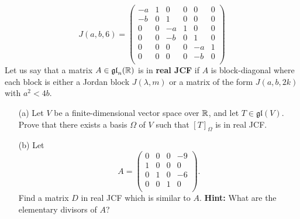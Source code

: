 \documentclass[12pt]{article}
\begin{document}
$$J(a,b,6)=\begin{pmatrix} 
-a & 1 & 0 & 0 & 0 & 0\\
-b & 0 & 1 & 0 & 0 & 0\\
 0 & 0 &-a & 1 & 0 & 0\\
 0 & 0 &-b & 0 & 1 & 0\\
 0 & 0 & 0 & 0 &-a & 1\\
 0 & 0 & 0 & 0 &-b & 0\\
\end{pmatrix}$$
Let us say that a matrix $A\in \mathfrak{gl}_n({\mathbb R})$ is in {\bf real JCF} if
$A$ is block-diagonal where each block is either a Jordan block $J(\lambda,m)$ or a matrix of the form $J(a,b,2k)$ with $a^2<4b$.
\begin{itemize}
\item[(a)]  Let $V$ be a finite-dimensional vector space over ${\mathbb R}$,
and let $T\in\mathfrak{gl}(V)$. Prove that there exists a basis $\Omega$ of $V$ such that $[T]_{\Omega}$ is in real JCF.
\item[(b)] Let
$$A=\begin{pmatrix}
0  &  0  &  0  & -9\\
1  &  0  &  0  &  0\\
0  &  1  &  0  & -6\\
0  &  0  &  1  &  0\\
\end{pmatrix}.$$
Find a matrix $D$ in real JCF which is similar to $A$. {\bf Hint:}
What are the elementary divisors of $A$?
\end{itemize}
\end{document}

